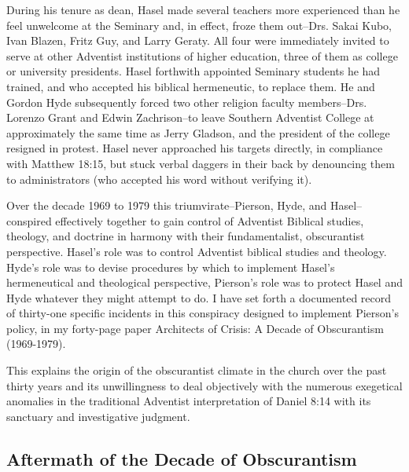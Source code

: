 During his tenure as dean, Hasel made several teachers more experienced than
he feel unwelcome at the Seminary and, in effect, froze them out--Drs.
Sakai Kubo, Ivan Blazen, Fritz Guy, and Larry Geraty. All four were
immediately invited to serve at other Adventist institutions of higher
education, three of them as college or university presidents. Hasel
forthwith appointed Seminary students he had trained, and who accepted his
biblical hermeneutic, to replace them. He and Gordon Hyde subsequently
forced two other religion faculty members--Drs. Lorenzo Grant and Edwin
Zachrison--to leave Southern Adventist College at approximately the same
time as Jerry Gladson, and the president of the college resigned in protest.
Hasel never approached his targets directly, in compliance with Matthew
18:15, but stuck verbal daggers in their back by denouncing them to
administrators (who accepted his word without verifying it).

Over the decade 1969 to 1979 this triumvirate--Pierson, Hyde, and
Hasel--conspired effectively together to gain control of Adventist Biblical
studies, theology, and doctrine in harmony with their fundamentalist,
obscurantist perspective. Hasel's 
role was to control Adventist biblical
studies and theology. Hyde's role was to devise procedures by which to
implement Hasel's hermeneutical and theological perspective, Pierson's role
was to protect Hasel and Hyde whatever they might attempt to do. I have set
forth a documented record of thirty-one specific incidents in this
conspiracy designed to implement Pierson's policy, in my forty-page paper
Architects of Crisis: A Decade of Obscurantism (1969-1979).

This explains the origin of the obscurantist climate in the church over the
past thirty years and its unwillingness to deal objectively with the
numerous exegetical anomalies in the traditional Adventist interpretation of
Daniel 8:14 with its sanctuary and investigative judgment.

\subsection{Aftermath of the Decade of Obscurantism}

